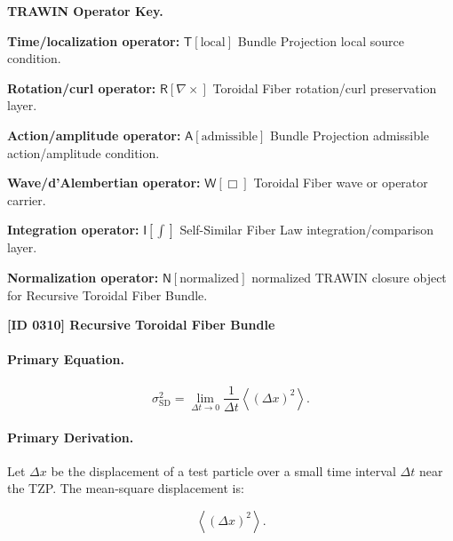 \par\vspace{0.45\baselineskip}
\noindent\begin{minipage}[t]{\linewidth}
\begingroup
\small
\raggedright
\textbf{TRAWIN Operator Key.}\par
\noindent\textbf{Time/localization operator:} $\mathsf{T}\!\left[\mathrm{local}\right]$ Bundle Projection local source condition.\par
\noindent\textbf{Rotation/curl operator:} $\mathsf{R}\!\left[\nabla\times\right]$ Toroidal Fiber rotation/curl preservation layer.\par
\noindent\textbf{Action/amplitude operator:} $\mathsf{A}\!\left[\mathrm{admissible}\right]$ Bundle Projection admissible action/amplitude condition.\par
\noindent\textbf{Wave/d'Alembertian operator:} $\mathsf{W}\!\left[\Box\right]$ Toroidal Fiber wave or operator carrier.\par
\noindent\textbf{Integration operator:} $\mathsf{I}\!\left[\int\right]$ Self-Similar Fiber Law integration/comparison layer.\par
\noindent\textbf{Normalization operator:} $\mathsf{N}\!\left[\mathrm{normalized}\right]$ normalized TRAWIN closure object for Recursive Toroidal Fiber Bundle.\par
\endgroup
\end{minipage}

\clearpage
\noindent\textbf{[ID 0310] Recursive Toroidal Fiber Bundle}\par
\vspace{0.35em}
\paragraph{Primary Equation.}
\begin{equation}
\sigma_{\mathrm{SD}}^{2}
=
\lim_{\Delta t\to 0}
\frac{1}{\Delta t}
\left\langle
(\Delta x)^2
\right\rangle .
\end{equation}

\paragraph{Primary Derivation.}
Let $\Delta x$ be the displacement of a test particle over a small time interval $\Delta t$ near the TZP.  
The mean-square displacement is:

\begin{equation}
\left\langle(\Delta x)^2\right\rangle .
\end{equation}

